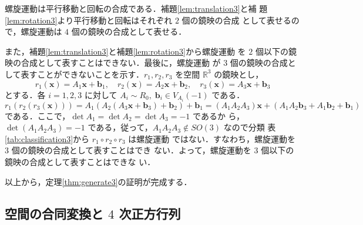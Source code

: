 \documentclass[11pt, uplatex, dvipdfmx, titlepage]{jsarticle}
\makeatletter
\renewenvironment{proof}[1][\proofname]{\par
  \pushQED{\qed}%
  \normalfont \topsep6\p@\@plus6\p@\relax
  \trivlist
  \item[\hskip\labelsep
         \bfseries
    {#1}]\ignorespaces
}{%
  \popQED\endtrivlist\@endpefalse
}
\theoremstyle{definition}
\renewcommand{\proofname}{\textbf{証明}}
\makeatother
\begin{document}
\begin{proof}
  螺旋運動は平行移動と回転の合成である．補題\ref{lem:translation3}と補
  題\ref{lem:rotation3}より平行移動と回転はそれぞれ $2$ 個の鏡映の合成
  として表せるので，螺旋運動は $4$ 個の鏡映の合成として表せる．

  また，補題\ref{lem:translation3}と補題\ref{lem:rotation3}から螺旋運動
  を $2$ 個以下の鏡映の合成として表すことはできない．最後に，螺旋運動
  が $3$ 個の鏡映の合成として表すことができないことを示す．$r_1, r_2,
  r_3$ を空間 $\mathbb{R}^3$ の鏡映とし，
  \[
    r_1(\bm{x}) = A_1 \bm{x} + \bm{b}_1, \quad r_2(\bm{x}) = A_2 \bm{x} + \bm{b}_2, \quad
    r_3(\bm{x}) = A_3 \bm{x} + \bm{b}_3
  \]
  とする．各 $i=1,2,3$ に対して $A_i \sim R_0, \; \bm{b}_i \in V_{A_i}(-1)$ である．
  \[
    r_1 \left( r_2 \left( r_3 \left( \bm{x}\right) \right) \right)
    = A_1 \left( A_2 \left( A_3 \bm{x}+\bm{b}_3\right) + \bm{b}_2\right) + \bm{b}_1
    = \left(A_1 A_2 A_3 \right)\bm{x} + \left(A_1 A_2 \bm{b}_3 + A_1 \bm{b}_2 + \bm{b}_1\right)
  \]
  である．ここで，$\det A_1 = \det A_2 = \det A_3=-1$ であるか
  ら，$\det \left(A_1 A_2 A_3 \right)=-1$
  である，従って，$A_1 A_2 A_3 \notin SO(3)$ なので分類
  表\ref{tab:classification3}から $r_1 \circ r_2 \circ r_3$ は螺旋運動
  ではない．すなわち，螺旋運動を $3$ 個の鏡映の合成として表すことはでき
  ない．よって，螺旋運動を $3$ 個以下の鏡映の合成として表すことはできな
  い．
\end{proof}

以上から，定理\ref{thm:generate3}の証明が完成する．

\newpage

\subsection{空間の合同変換と $4$ 次正方行列}
\end{document}
